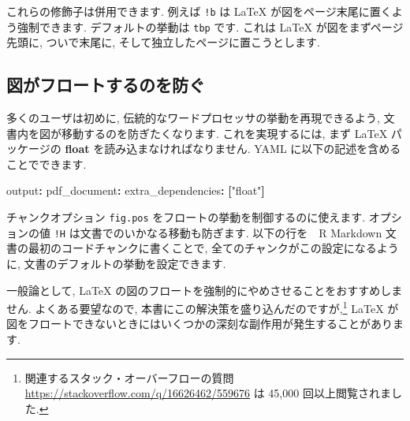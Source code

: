 \documentclass[
  11pt,
  lualatex,
  ja=standard]{bxjsreport}
\newenvironment{Shaded}{\begin{snugshade}}{\end{snugshade}}
\newcommand{\AttributeTok}[1]{\textcolor[rgb]{0.77,0.63,0.00}{#1}}
\newcommand{\FunctionTok}[1]{\textcolor[rgb]{0.00,0.00,0.00}{#1}}
\newcommand{\KeywordTok}[1]{\textcolor[rgb]{0.13,0.29,0.53}{\textbf{#1}}}
\newcommand{\NormalTok}[1]{#1}
\newcommand{\SpecialCharTok}[1]{\textcolor[rgb]{0.00,0.00,0.00}{#1}}
\newcommand{\StringTok}[1]{\textcolor[rgb]{0.31,0.60,0.02}{#1}}
\begin{document}
これらの修飾子は併用できます. 例えば \texttt{!b} は LaTeX が図をページ末尾に置くよう強制できます. デフォルトの挙動は \texttt{tbp} です. これは LaTeX が図をまずページ先頭に, ついで末尾に, そして独立したページに置こうとします.

\hypertarget{prevent-figures-from-floating}{%
\subsection{図がフロートするのを防ぐ}\label{prevent-figures-from-floating}}

多くのユーザは初めに, 伝統的なワードプロセッサの挙動を再現できるよう, 文書内を図が移動するのを防ぎたくなります. これを実現するには, まず LaTeX パッケージの \textbf{float} を読み込まなければなりません. YAML に以下の記述を含めることでできます.

\begin{Shaded}
\begin{Highlighting}[]
\FunctionTok{output}\KeywordTok{:}\AttributeTok{ }
\AttributeTok{  }\FunctionTok{pdf\_document}\KeywordTok{:}
\AttributeTok{    }\FunctionTok{extra\_dependencies}\KeywordTok{:}\AttributeTok{ }\KeywordTok{[}\StringTok{"float"}\KeywordTok{]}
\end{Highlighting}
\end{Shaded}

チャンクオプション \texttt{fig.pos} をフロートの挙動を制御するのに使えます. オプションの値 \texttt{!H} は文書でのいかなる移動も防ぎます. 以下の行を　R Markdown 文書の最初のコードチャンクに書くことで, 全てのチャンクがこの設定になるように, 文書のデフォルトの挙動を設定できます.

\begin{Shaded}
\end{Shaded}

一般論として, LaTeX の図のフロートを強制的にやめさせることをおすすめしません. よくある要望なので, 本書にこの解決策を盛り込んだのですが,\footnote{関連するスタック・オーバーフローの質問 \url{https://stackoverflow.com/q/16626462/559676} は 45,000 回以上閲覧されました.} LaTeX が図をフロートできないときにはいくつかの深刻な副作用が発生することがあります.
\end{document}

